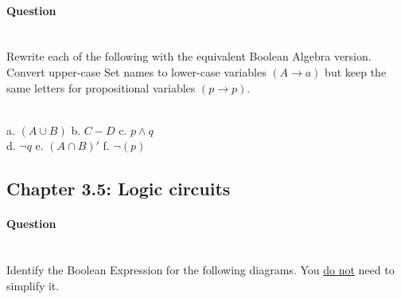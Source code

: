 \documentclass[a4paper,12pt]{book} \usepackage[utf8]{inputenc} \title{} \author{Rachel Morris} \date{\today}
\newcounter{question}
\begin{document}
    \paragraph{Question \thequestion} ~\\

        Rewrite each of the following with the equivalent Boolean Algebra version.
        Convert upper-case Set names to lower-case variables $(A \to a)$ but
        keep the same letters for propositional variables $(p \to p)$.

            ~\\
            a. $(A \cup B)$     \tab
            b. $C - D$          \tab
            c. $p \land q$      \\
            d. $\neg q$         \tab[1.8cm] 
            e. $(A \cap B)'$    \tab[0.6cm]
            f. $\neg(p)$



\subsection*{Chapter 3.5: Logic circuits}

    \paragraph{Question \thequestion} ~\\

        Identify the Boolean Expression for the following diagrams.
        You \underline{do not} need to simplify it.
\end{document}
